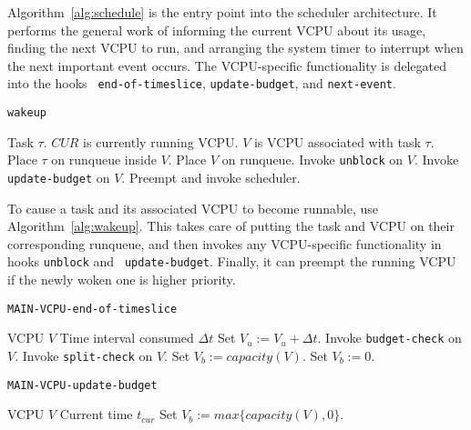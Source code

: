 \documentclass[twocolumn,10pt]{article}
\begin{document}
Algorithm~\ref{alg:schedule} is the entry point into the scheduler
architecture.  It performs the general work of informing the current
VCPU about its usage, finding the next VCPU to run, and arranging the
system timer to interrupt when the next important event occurs.  The
VCPU-specific functionality is delegated into the hooks {\tt
  end-of-timeslice}, {\tt update-budget}, and {\tt next-event}.

\begin{algorithm}[!htb]
  \caption {\tt wakeup}\label{alg:wakeup}
  \begin{algorithmic}[1]\algorithmsize
    \REQUIRE Task $\tau$.
    \REQUIRE $CUR$ is currently running VCPU.
    \REQUIRE $V$ is VCPU associated with task $\tau$.
    \STATE Place $\tau$ on runqueue inside $V$.
    \STATE Place $V$ on runqueue.
    \STATE Invoke {\tt unblock} on $V$.
    \STATE Invoke {\tt update-budget} on $V$.
    \STATE Preempt and invoke scheduler.
    \ENDIF
  \end{algorithmic}
\end{algorithm}

To cause a task and its associated VCPU to become runnable, use
Algorithm~\ref{alg:wakeup}.  This takes care of putting the task and
VCPU on their corresponding runqueue, and then invokes any
VCPU-specific functionality in hooks {\tt unblock} and {\tt
  update-budget}.  Finally, it can preempt the running VCPU if the
newly woken one is higher priority.

\begin{algorithm}[!htb]
  \caption{\tt MAIN-VCPU-end-of-timeslice}\label{alg:vcpu_eot}
  \begin{algorithmic}[1]\algorithmsize
    \REQUIRE VCPU $V$
    \REQUIRE Time interval consumed $\Delta t$
    \STATE Set $V_u:=V_u+\Delta t$.
    \STATE Invoke {\tt budget-check} on $V$.
    \STATE Invoke {\tt split-check} on $V$.
    \ENDIF
    \STATE Set $V_b:=capacity(V)$.
    \ELSE
    \STATE Set $V_b:=0$.
    \ENDIF
  \end{algorithmic}
\end{algorithm}

\begin{algorithm}[!htb]
  \caption{\tt MAIN-VCPU-update-budget}\label{alg:vcpu_upbudg}
  \begin{algorithmic}[1]\algorithmsize
    \REQUIRE VCPU $V$
    \REQUIRE Current time $t_{cur}$
    \STATE Set $V_b:=max\{capacity(V), 0\}$.
  \end{algorithmic}
\end{algorithm}
\end{document}

